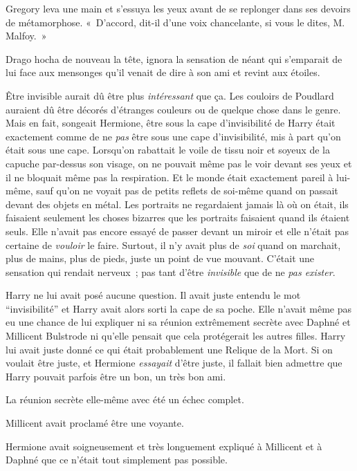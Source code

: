 Gregory leva une main et s'essuya les yeux avant de se replonger dans ses devoirs de métamorphose. «~D'accord, dit-il d'une voix chancelante, si vous le dites, M. Malfoy.~»

Drago hocha de nouveau la tête, ignora la sensation de néant qui s'emparait de lui face aux mensonges qu'il venait de dire à son ami et revint aux étoiles.


Être invisible aurait dû être plus \emph{intéressant} que ça. Les couloirs de Poudlard auraient dû être décorés d'étranges couleurs ou de quelque chose dans le genre. Mais en fait, songeait Hermione, être sous la cape d'invisibilité de Harry était exactement comme de ne \emph{pas} être sous une cape d'invisibilité, mis à part qu'on était sous une cape. Lorsqu'on rabattait le voile de tissu noir et soyeux de la capuche par-dessus son visage, on ne pouvait même pas le voir devant ses yeux et il ne bloquait même pas la respiration. Et le monde était exactement pareil à lui-même, sauf qu'on ne voyait pas de petits reflets de soi-même quand on passait devant des objets en métal. Les portraits ne regardaient jamais là où on était, ils faisaient seulement les choses bizarres que les portraits faisaient quand ils étaient seuls. Elle n'avait pas encore essayé de passer devant un miroir et elle n'était pas certaine de \emph{vouloir} le faire. Surtout, il n'y avait plus de \emph{soi} quand on marchait, plus de mains, plus de pieds, juste un point de vue mouvant. C'était une sensation qui rendait nerveux~; pas tant d'être \emph{invisible} que de ne \emph{pas exister}.

Harry ne lui avait posé aucune question. Il avait juste entendu le mot “invisibilité” et Harry avait alors sorti la cape de sa poche. Elle n'avait même pas eu une chance de lui expliquer ni sa réunion extrêmement secrète avec Daphné et Millicent Bulstrode ni qu'elle pensait que cela protégerait les autres filles. Harry lui avait juste donné ce qui était probablement une Relique de la Mort. Si on voulait être juste, et Hermione \emph{essayait} d'être juste, il fallait bien admettre que Harry pouvait parfois être un bon, un très bon ami.

La réunion secrète elle-même avec été un échec complet.

Millicent avait proclamé être une voyante.

Hermione avait soigneusement et très longuement expliqué à Millicent et à Daphné que ce n'était tout simplement pas possible.

